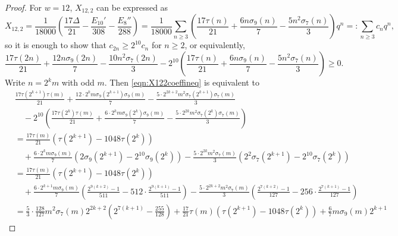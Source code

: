 \documentclass[10pt,reqno]{amsproc}
\newcommand{\1}{\mathds{1}}	%
\theoremstyle{definition}
\theoremstyle{remark}
\begin{document}
\begin{proof}
For $w = 12$, $X_{12, 2}$ can be expressed as
\[
X_{12, 2} = \frac{1}{18000} \left(\frac{17 \Delta}{21} - \frac{E_{10}'}{308} - \frac{E_8''}{288}\right) = \frac{1}{18000} \sum_{n \ge 3}\left(\frac{17 \tau(n)}{21} + \frac{6n\sigma_9(n)}{7} - \frac{5n^2 \sigma_7(n)}{3}\right) q^n =: \sum_{n \ge 3} c_n q^n,
\]
so it is enough to show that $c_{2n} \ge 2^{10} c_n$ for $n \ge 2$, or equivalently,
\begin{equation}
    \frac{17 \tau(2n)}{21} + \frac{12n\sigma_9(2n)}{7} - \frac{10 n^2 \sigma_7(2n)}{3} - 2^{10} \left(\frac{17 \tau(n)}{21} + \frac{6 n \sigma_9(n)}{7} - \frac{5 n^2 \sigma_7(n)}{3}\right) \ge 0. \label{eqn:X122coeffineq}
\end{equation}
Write $n = 2^k m$ with odd $m$.
Then \eqref{eqn:X122coeffineq} is equivalent to
\begin{align}
    &\frac{17 \tau(2^{k+1}) \tau(m)}{21} + \frac{12 \cdot 2^{k} m \sigma_9(2^{k+1}) \sigma_9(m)}{7} - \frac{5 \cdot 2^{2k+2} m^2 \sigma_7(2^{k+1}) \sigma_7(m)}{3} \nonumber \\
    &\quad - 2^{10} \left(\frac{17 \tau(2^k) \tau(m)}{21} + \frac{6 \cdot 2^k m \sigma_9(2^k) \sigma_9(m)}{7} - \frac{5 \cdot 2^{2k} m^2 \sigma_7(2^k) \sigma_7(m)}{3}\right) \nonumber \\
    &= \frac{17\tau(m)}{21} (\tau(2^{k+1}) - 1048 \tau(2^k)) \nonumber \\
    &\quad + \frac{6 \cdot 2^k m \sigma_9(m)}{7} (2 \sigma_9(2^{k+1}) - 2^{10} \sigma_9(2^k)) - \frac{5 \cdot 2^{2k} m^2 \sigma_7(m)}{3} (2^2 \sigma_7(2^{k+1}) - 2^{10} \sigma_7(2^k)) \nonumber \\
    &= \frac{17\tau(m)}{21} (\tau(2^{k+1}) - 1048 \tau(2^k)) \nonumber \\
    &\quad + \frac{6 \cdot 2^{k+1} m \sigma_9(m)}{7} \left(\frac{2^{9(k+2)}-1}{511} - 512 \cdot \frac{2^{9(k+1)}-1}{511}\right) - \frac{5 \cdot 2^{2k+2} m^2 \sigma_7(m)}{3} \left(\frac{2^{7(k+2)}-1}{127} - 256 \cdot \frac{2^{7(k+1)}-1}{127}\right) \nonumber \\
    &=\frac{5}{3} \cdot \frac{128}{127} m^2 \sigma_7(m) 2^{2k+2} \left(2^{7(k+1)} - \frac{255}{128}\right) + \frac{17}{21} \tau(m) \left(\tau(2^{k+1}) - 1048 \tau(2^{k})\right) + \frac{6}{7} m \sigma_9(m) 2^{k+1} \label{eqn:x122coeff}
\end{align}


\end{proof}
\end{document}
